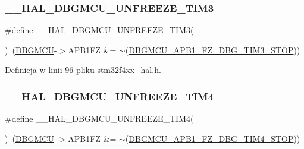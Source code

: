 \subsubsection{\texorpdfstring{\+\_\+\+\_\+\+H\+A\+L\+\_\+\+D\+B\+G\+M\+C\+U\+\_\+\+U\+N\+F\+R\+E\+E\+Z\+E\+\_\+\+T\+I\+M3}{\_\_HAL\_DBGMCU\_UNFREEZE\_TIM3}}
{\footnotesize\ttfamily \#define \+\_\+\+\_\+\+H\+A\+L\+\_\+\+D\+B\+G\+M\+C\+U\+\_\+\+U\+N\+F\+R\+E\+E\+Z\+E\+\_\+\+T\+I\+M3(\begin{DoxyParamCaption}{ }\end{DoxyParamCaption})~(\hyperlink{group___peripheral__declaration_ga92ec6d9ec2251fda7d4ce09748cd74b4}{D\+B\+G\+M\+CU}-\/$>$A\+P\+B1\+FZ \&= $\sim$(\hyperlink{group___peripheral___registers___bits___definition_ga2fea6834f4ef9fc6b403cd079a001cec}{D\+B\+G\+M\+C\+U\+\_\+\+A\+P\+B1\+\_\+\+F\+Z\+\_\+\+D\+B\+G\+\_\+\+T\+I\+M3\+\_\+\+S\+T\+OP}))}



Definicja w linii 96 pliku stm32f4xx\+\_\+hal.\+h.

\mbox{\label{group___h_a_l___exported___macros_gac73202fc9f0913f52ef70c42b6cab287}} 
\subsubsection{\texorpdfstring{\+\_\+\+\_\+\+H\+A\+L\+\_\+\+D\+B\+G\+M\+C\+U\+\_\+\+U\+N\+F\+R\+E\+E\+Z\+E\+\_\+\+T\+I\+M4}{\_\_HAL\_DBGMCU\_UNFREEZE\_TIM4}}
{\footnotesize\ttfamily \#define \+\_\+\+\_\+\+H\+A\+L\+\_\+\+D\+B\+G\+M\+C\+U\+\_\+\+U\+N\+F\+R\+E\+E\+Z\+E\+\_\+\+T\+I\+M4(\begin{DoxyParamCaption}{ }\end{DoxyParamCaption})~(\hyperlink{group___peripheral__declaration_ga92ec6d9ec2251fda7d4ce09748cd74b4}{D\+B\+G\+M\+CU}-\/$>$A\+P\+B1\+FZ \&= $\sim$(\hyperlink{group___peripheral___registers___bits___definition_ga7ac65bf9342bb8acbcb25938e93abc45}{D\+B\+G\+M\+C\+U\+\_\+\+A\+P\+B1\+\_\+\+F\+Z\+\_\+\+D\+B\+G\+\_\+\+T\+I\+M4\+\_\+\+S\+T\+OP}))}



